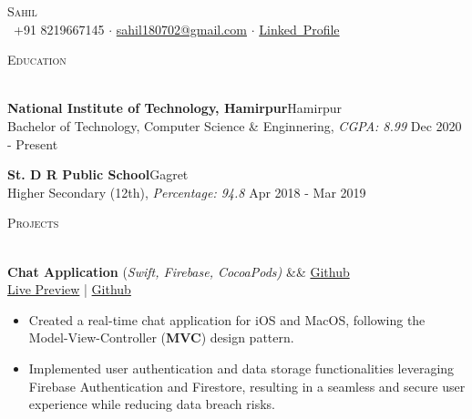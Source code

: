 \documentclass[a4paper]{article}
\newcommand{\bulletSep} { \vspace{2.2mm} }
\newcommand{\sectionSep} { \vspace{3mm} }
\newcommand{\lineunder} {
    \vspace*{-8pt} \\
    \hspace*{-15pt} \hrulefill \\
}
\newcommand{\header} [1] {
    {\hspace*{-18pt}\vspace*{6pt} {
        \fontfamily{qcs}\selectfont \large \scshape #1
    }}
    \vspace*{-6pt} \lineunder
    \vspace{0.5mm}
}
\newcommand{\educationItem}[5]{
    \textbf{#1}\hfill #2\\
    #3, \textit{#4} \hfill #5\\
}
\newcommand{\experienceItem}[5]{
    \textbf{#1} \hfill #2 \\
    \textit{#3} \hfill #4 \\
    \begin{itemize}
        #5
    \end{itemize}
}
\newcommand{\projectItem}[5]{
    {\textbf{#1}} {(\sl #2)}\hfill
    \ifx&#3&%
    \href{#4}{Github}\\
    \else
    \href{#3}{Live Preview} | \href{#4}{Github}\\
    \fi
    \begin{itemize}
        #5
    \end{itemize}
}
\begin{document}

\begin{center}
    {\Huge \scshape {}\selectfont Sahil}\\
    \vspace{0.5mm}
    \faPhone~+91 8219667145
    $\cdot$
    \href{mailto:sahil180702@gmail.com}{sahil180702@gmail.com}
    $\cdot$
    \href{https://www.linkedin.com/in/sahil-187-/}{Linked\faLinkedinSquare~Profile}
\end{center}

\vspace{-2mm}


\header{Education}

\educationItem{National Institute of Technology, Hamirpur}{Hamirpur}{Bachelor of Technology, Computer Science \& Enginnering}{CGPA: 8.99}{Dec 2020 - Present}
\bulletSep

\educationItem{St. D R Public School}{Gagret}{Higher Secondary (12th)}{Percentage: 94.8}{Apr 2018 - Mar 2019}
\sectionSep






\header{Projects}
\projectItem{Chat Application}{Swift, Firebase, CocoaPods}{}{https://github.com/Sahil-187/Flash-Chat-iOS13.git}{
    \item Created a real-time chat application for iOS and MacOS, following the Model-View-Controller (\textbf{MVC}) design pattern. 
    \item Implemented user authentication and data storage functionalities leveraging Firebase Authentication and Firestore, resulting in a seamless and secure user experience while reducing data breach risks.
}
\bulletSep
\end{document}
